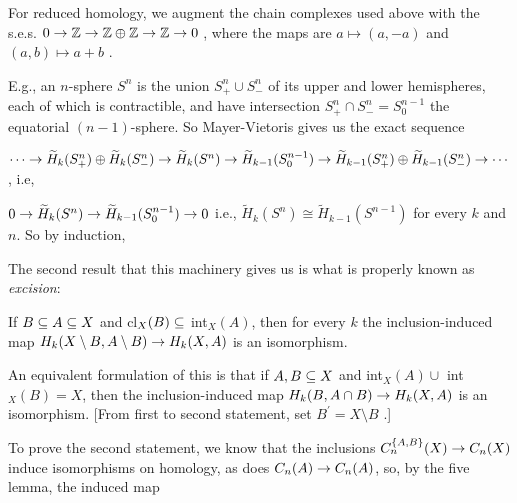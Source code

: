 \ssk


\ssk

For reduced homology, we augment the chain complexes used above with the 
s.e.s. \hhsk $0\rightarrow {\Bbb Z}\rightarrow {\Bbb Z}\oplus {\Bbb Z} \rightarrow {\Bbb Z} \rightarrow 0$ , 
where the maps are $a\mapsto (a,-a)$ and $(a,b)\mapsto a+b$ .

\msk

E.g., an $n$-sphere $S^n$
is the union $S^n_+\cup S^n_-$ of its upper and lower hemispheres, each of which 
is contractible, and have intersection $S^n_+\cap S^n_-=S^{n-1}_0$ the equatorial
$(n-1)$-sphere. So Mayer-Vietoris gives us the exact sequence

\hhsk $\cdots \rightarrow \widetilde{H}_k(S^n_+)\oplus \widetilde{H}_k(S^n_-) \rightarrow \widetilde{H}_k(S^n)
\rightarrow \widetilde{H}_{k-1}(S^{n-1}_0) \rightarrow \widetilde{H}_{k-1}(S^n_+)\oplus \widetilde{H}_{k-1}(S^n_-)\rightarrow \cdots$ 
\hhsk , i.e, \hhsk

$0 \rightarrow \widetilde{H}_k(S^n)\rightarrow \widetilde{H}_{k-1}(S^{n-1}_0) \rightarrow  0$ \hhsk 
i.e., $\widetilde{H}_k(S^n)\cong \widetilde{H}_{k-1}(S^{n-1})$ for every $k$ and $n$. 
So by induction, 

\ssk


\vfill
\eject

The second result that this machinery gives us is what is properly known as {\it excision}:

\msk

If $B\subseteq A\subseteq X$ and cl$_X(B)\subseteq$ int$_X(A)$, then for every $k$ the inclusion-induced map 
$H_k(X\setminus B,A\setminus B)\rightarrow H_k(X,A)$ is an isomorphism. 

\msk

An equivalent formulation of this is that if $A,B\subseteq X$ and int$_X(A)\cup$ int$_X(B) = X$, then the
inclusion-induced map $H_k(B,A\cap B)\rightarrow H_k(X,A)$ is an isomorphism. [From first to second
statement, set $B^\prime = X\setminus B$ .] 

\ssk

To prove the second statement, we know that
the inclusions $C_n^{\{A,B\}}(X) \rightarrow C_n(X)$ induce isomorphisms on homology, as does 
$C_n(A) \rightarrow C_n(A)$, so, by the five lemma, the induced map

